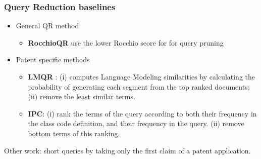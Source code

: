 \documentclass[xcolor=x11names,compress]{beamer}
\renewcommand{\(}{\begin{columns}}
\renewcommand{\)}{\end{columns}}
\newcommand{\<}[1]{\begin{column}{#1}}
\renewcommand{\>}{\end{column}}
\begin{document}


\begin{frame}
\frametitle{Query Reduction baselines}
\begin{itemize}
\item {\color{DeepSkyBlue4}General QR method}
	\begin{itemize}
	\item \textbf{RocchioQR} use the lower Rocchio score for for query pruning
	\end{itemize}	
\item {\color{DeepSkyBlue4}Patent specific methods}	
	\begin{itemize}
	\item \textbf{LMQR} \citep{Ganguly2011}: (i) computes Language Modeling similarities by calculating the probability of generating each segment from the top ranked documents; (ii) remove the least similar terms.
	\item \textbf{IPC}: 
(i) rank the terms of the query according to both their frequency in the class
code definition, and their frequency in the query.
(ii) remove bottom terms of this ranking.
\end{itemize}
\end{itemize}

\vspace{0.5cm}
\begin{small}
{\color{DeepSkyBlue4}Other work}: \citep{Mahdabi2013} short queries by taking only the first claim of a patent application.
\end{small}
\end{frame}
\end{document}
